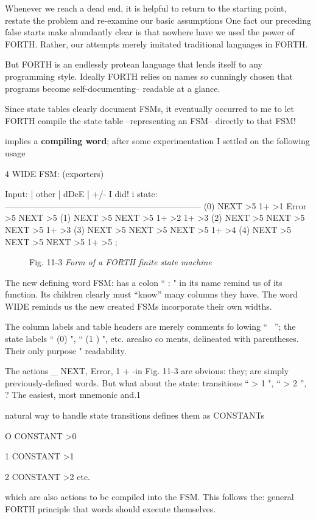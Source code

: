 Whenever we reach a dead end, it is helpful to return to the starting point, restate the problem and re-examine our basic assumptions One fact our preceding false starts make abundantly clear is that nowhere have we used the power of FORTH. Rather, our attempts merely imitated traditional languages in FORTH.

But FORTH is an endlessly protean language that lends itself to any programming style. Ideally FORTH relies on names so cunningly chosen that programs become self-documenting-- readable at a glance.

Since state tables clearly document FSMs, it eventually occurred to me to let FORTH compile the state table --representing an FSM-- directly to that FSM!

 implies a \textbf{compiling word}; after some experimentation I settled on the following usage

4 WIDE FSM: (exporters)

Input: | other | dDeE | +/- I did! i
state: ———————————————————————
(0) NEXT >5 1+ >1 Error >5 NEXT >5
(1) NEXT >5 NEXT >5 1+ >2 1+ >3
(2) NEXT >5 NEXT >5 NEXT >5 1+ >3
(3) NEXT >5 NEXT >5 NEXT >5 1+ >4
(4) NEXT >5 NEXT >5 NEXT >5 1+ >5 ;

\begin{figure}
    \caption{Fig. 11-3 \textit{Form of a FORTH finite state machine}}
\end{figure}

The new defining word FSM: has a colon “ : " in its name
remind us of its function. Its children clearly must “know”
many columns they have. The word WIDE reminds us the new
created FSMs incorporate their own widths.

The column labels and table headers are merely comments fo
lowing “ \ ”; the state labels “ (0) ", “ (1 ) ", etc. arealso co
ments, delineated with parentheses. Their only purpose "
readability.

The actions \_ NEXT, Error, 1 + -in Fig. 11-3 are obvious: they;
are simply previously-defined words. But what about the state:
transitions “ > 1 ", “ > 2 ”, ? The easiest, most mnemonic and.1

natural way to handle state transitions defines them as CONSTANTs

 

O CONSTANT >0

1 CONSTANT >1

2 CONSTANT >2
etc.

which are also actions to be compiled into the FSM. This follows the:
general FORTH principle that words should execute themselves.

